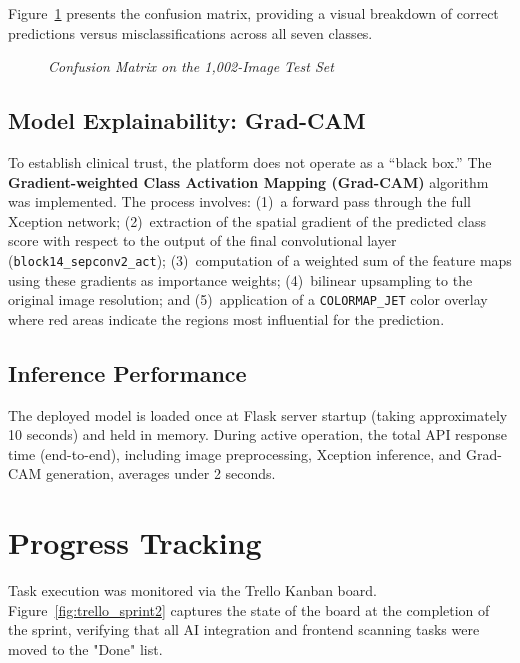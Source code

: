 Figure~\ref{fig:confusion_matrix} presents the confusion matrix, providing a
visual breakdown of correct predictions versus misclassifications across all
seven classes.

\begin{figure}[H]
	\centering
	\caption{\textit{Confusion Matrix on the 1,002-Image Test Set}}
	\label{fig:confusion_matrix}
\end{figure}

\subsection{Model Explainability: Grad-CAM}
To establish clinical trust, the platform does not operate as a ``black box.''
The \textbf{Gradient-weighted Class Activation Mapping (Grad-CAM)}
algorithm~\cite{Selvaraju2017} was implemented. The process involves: (1)~a
forward pass through the full Xception network; (2)~extraction of the spatial
gradient of the predicted class score with respect to the output of the final
convolutional layer (\texttt{block14\_sepconv2\_act}); (3)~computation of a
weighted sum of the feature maps using these gradients as importance weights;
(4)~bilinear upsampling to the original image resolution; and (5)~application
of a \texttt{COLORMAP\_JET} color overlay where red areas indicate the regions
most influential for the prediction.

\subsection{Inference Performance}
The deployed model is loaded once at Flask server startup (taking approximately 10 seconds) and held in memory. During active operation, the total API response time (end-to-end), including image preprocessing, Xception inference, and Grad-CAM generation, averages under 2 seconds.

\section{Progress Tracking}
Task execution was monitored via the Trello Kanban board. Figure~\ref{fig:trello_sprint2} captures the state of the board at the completion of the sprint, verifying that all AI integration and frontend scanning tasks were moved to the "Done" list.

